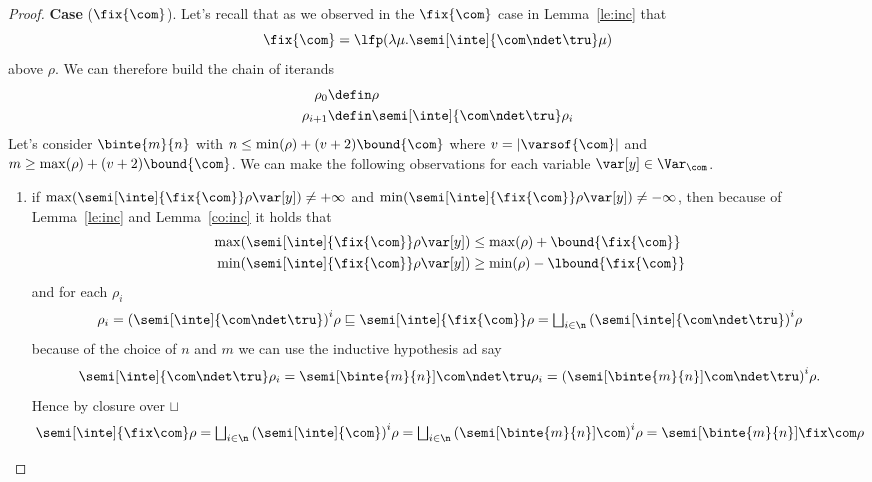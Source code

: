 \begin{proof}
  \noindent
  \textbf{Case} (\(\fix{\com}\)).
  Let's recall that as we observed in the \(\fix{\com}\) case in
  Lemma~\ref{le:inc} that
  \[{\fix{\com} = \lfp(\lambda \mu . \semi[\inte]{\com \ndet
        \tru}\mu)}\] above \(\rho\). We can therefore build the chain
  of iterands
  \begin{align*}
    \rho_0 & \defin \rho \\
    \rho_{i+1} & \defin \semi[\inte]{\com \ndet \tru}\rho_i
  \end{align*}
  Let's consider \(\binte{m}{n}\) with
  \(n \leq \min(\rho) + (v+2)\bound{\com}\) where
  \(v = |\varsof{\com}|\) and
  \(m \geq \max(\rho) + (v+2)\bound{\com}\). We can make the following
  observations for each variable \(\var[y]\in \Var_{\com}\).
  \begin{enumerate}[label=(\roman*)]
  \item if
    \({\max(\semi[\inte]{\fix{\com}}\rho\var[y]) \neq +\infty}\) and
    \({\min(\semi[\inte]{\fix{\com}}\rho\var[y]) \neq -\infty}\), then
    because of Lemma~\ref{le:inc} and Lemma~\ref{co:inc} it holds
    that
    \begin{align*}
      \max(\semi[\inte]{\fix{\com}}\rho\var[y]) & \leq \max(\rho) + \bound{\fix{\com}} \\
      \min(\semi[\inte]{\fix{\com}}\rho\var[y]) & \geq \min(\rho) - \lbound{\fix{\com}}
    \end{align*}
    and for each \(\rho_i\)
    \begin{equation*}
      \rho_i = {\left(\semi[\inte]{\com \ndet \tru}\right)}^i\rho \sqsubseteq
      \semi[\inte]{\fix{\com}}\rho = 
      \textstyle\bigsqcup_{i\in\n} {\left(\semi[\inte]{\com \ndet \tru}\right)}^i\rho
    \end{equation*}
    because of the choice of \(n\) and \(m\) we can use the inductive
    hypothesis ad say
    \begin{equation*}
      \semi[\inte]{\com \ndet \tru}\rho_i =
      \semi[\binte{m}{n}]{\com \ndet \tru}\rho_i =
      {\left(\semi[\binte{m}{n}]{\com\ndet \tru}\right)}^i\rho.
    \end{equation*}
    Hence  by closure over \(\sqcup\)
    \begin{equation*}
      \semi[\inte]{\fix\com}\rho =
      \textstyle\bigsqcup_{i\in\n} {\left(\semi[\inte]{\com}\right)}^i\rho = 
      \textstyle\bigsqcup_{i\in\n} {\left(\semi[\binte{m}{n}]{\com}\right)}^i\rho = 
      \semi[\binte{m}{n}]{\fix\com}\rho
    \end{equation*}
    

\end{enumerate}
\end{proof}
